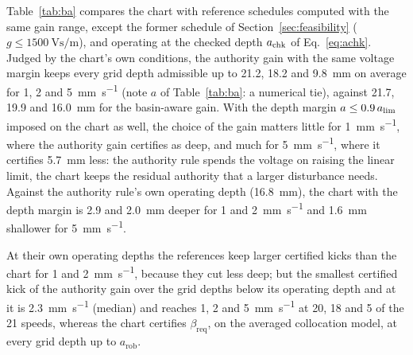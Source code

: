 Table~\ref{tab:ba} compares the chart with reference schedules computed with the same gain range, except the former schedule of Section~\ref{sec:feasibility} ($g\le\SI{1500}{\volt\second\per\metre}$), and operating at the checked depth $a_{\mathrm{chk}}$ of Eq.~\eqref{eq:achk}. Judged by the chart's own conditions, the authority gain with the same voltage margin keeps every grid depth admissible up to 21.2, 18.2 and \SI{9.8}{\milli\metre} on average for 1, 2 and \SI{5}{\milli\metre\per\second} (note $a$ of Table~\ref{tab:ba}: a numerical tie), against 21.7, 19.9 and \SI{16.0}{\milli\metre} for the basin-aware gain. With the depth margin $a\le0.9\,a_{\lim}$ imposed on the chart as well, the choice of the gain matters little for \SI{1}{\milli\metre\per\second}, where the authority gain certifies as deep, and much for \SI{5}{\milli\metre\per\second}, where it certifies \SI{5.7}{\milli\metre} less: the authority rule spends the voltage on raising the linear limit, the chart keeps the residual authority that a larger disturbance needs. Against the authority rule's own operating depth (\SI{16.8}{\milli\metre}), the chart with the depth margin is 2.9 and \SI{2.0}{\milli\metre} deeper for 1 and \SI{2}{\milli\metre\per\second} and \SI{1.6}{\milli\metre} shallower for \SI{5}{\milli\metre\per\second}.

At their own operating depths the references keep larger certified kicks than the chart for 1 and \SI{2}{\milli\metre\per\second}, because they cut less deep; but the smallest certified kick of the authority gain over the grid depths below its operating depth and at it is \SI{2.3}{\milli\metre\per\second} (median) and reaches 1, 2 and \SI{5}{\milli\metre\per\second} at 20, 18 and 5 of the 21 speeds, whereas the chart certifies $\beta_{\mathrm{req}}$, on the averaged collocation model, at every grid depth up to $a_{\mathrm{rob}}$.

